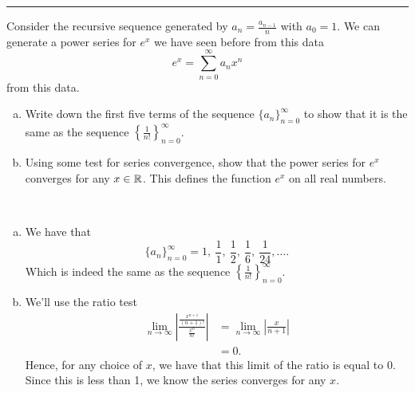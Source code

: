 \documentclass[12pt]{article} %
\begin{document}
\hrule
\begin{problem}
Consider the recursive sequence generated by $a_n = \frac{a_{n-1}}{n}$ with $a_0=1$.  We can generate a power series for $e^x$ we have seen before from this data
\[
e^x=\sum_{n=0}^\infty a_n x^n
\]
from this data. 
\begin{enumerate}[(a)]
    \item Write down the first five terms of the sequence $\{a_n\}_{n=0}^\infty$ to show that it is the same as the sequence $\left\{\frac{1}{n!}\right\}_{n=0}^\infty$.
    \item Using some test for series convergence, show that the power series for $e^x$ converges for any $x\in \mathbb{R}$. This defines the function $e^x$ on all real numbers.
\end{enumerate}
\end{problem}
\begin{solution}~
\begin{enumerate}[(a)]
    \item We have that
    \[
    \{a_n\}_{n=0}^\infty = 1,~\frac{1}{1}, ~\frac{1}{2}, ~\frac{1}{6}, ~\frac{1}{24},\dots.
    \]
    Which is indeed the same as the sequence $\left\{ \frac{1}{n!}\right\}_{n=0}^\infty$.
    \item We'll use the ratio test 
    \begin{align*}
        \lim_{n\to \infty} \left| \frac{\frac{x^{n+1}}{(n+1)!}}{\frac{x^n}{n!}}\right| &= \lim_{n\to \infty} \left| \frac{x}{n+1} \right|\\
        &=0.
    \end{align*}
    Hence, for any choice of $x$, we have that this limit of the ratio is equal to 0. Since this is less than 1, we know the series converges for any $x$.
\end{enumerate}
\end{solution}
\end{document}
